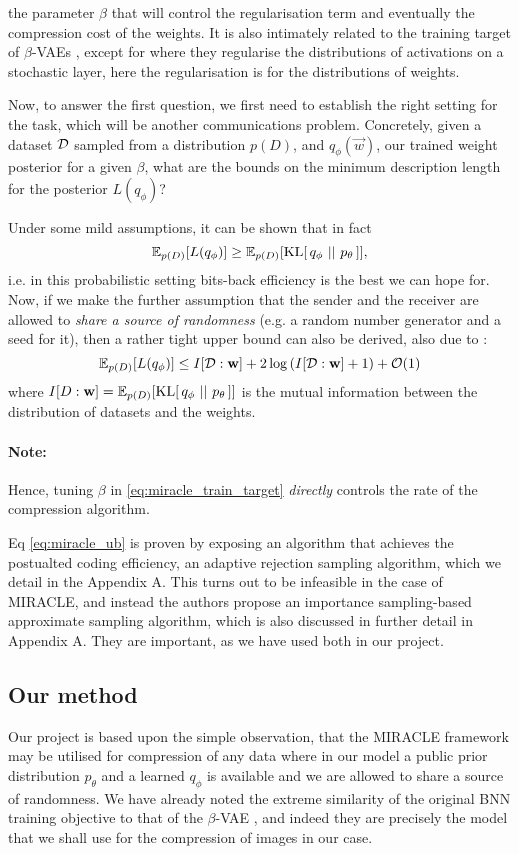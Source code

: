 the parameter $\beta$ that will control the regularisation term and eventually
the compression cost of the weights. It is also intimately related to the
training target of $\beta$-VAEs \cite{higgins2017beta}, except for where they
regularise the distributions of activations on a stochastic layer, here the
regularisation is for the distributions of weights. 
\par
Now, to answer the first question, we first need to establish the right setting
for the task, which will be another communications problem.
Concretely, given a dataset $\mathcal{D}$ sampled from a distribution $p(D)$, and
$q_\phi(\vec{w})$, our trained weight posterior for a given $\beta$, what are
the bounds on the minimum description length for the posterior $L(q_{\phi})$?
\par
Under some mild assumptions, it can be shown \cite{harsha2007communication} that
in fact
\[
  \mathbb{E}_{p(D)}[L(q_{\phi})] \geq \mathbb{E}_{p(D)}[\mathrm{KL}[\,q_{\phi}\,\,||\,\,p_{\theta}\,]],
\]
i.e. in this probabilistic setting bits-back efficiency is the best we can hope
for. Now, if we make the further assumption that the sender and the receiver are
allowed to \textit{share a source of randomness} (e.g. a random number generator
and a seed for it), then a rather tight upper bound can also be derived, also
due to \cite{harsha2007communication}:
\begin{equation}
\label{eq:miracle_ub}
  \mathbb{E}_{p(D)}[L(q_{\phi})] \leq I[\mathcal{D} : \mathbf{w}] + 2 \log \left( I[\mathcal{D} :
    \mathbf{w}] + 1 \right) + \mathcal{O}(1)
\end{equation}
where $I[D : \mathbf{w}] = \mathbb{E}_{p(D)}[\mathrm{KL}[\,q_{\phi}\,\,||\,\,p_{\theta}\,]]$ is the
mutual information between the distribution of datasets and the weights.
\paragraph{Note:} Hence, tuning $\beta$ in \ref{eq:miracle_train_target}
\textit{directly} controls the rate of the compression algorithm.
\par
Eq \ref{eq:miracle_ub} is proven by exposing an algorithm that achieves the
postualted coding efficiency, an adaptive rejection sampling algorithm, which we
detail in the Appendix A. This turns out to be infeasible in the case of
MIRACLE, and instead the authors propose an importance sampling-based
approximate sampling algorithm, which is also discussed in further detail in
Appendix A. They are important, as we have used both in our project.

\subsection{Our method}
Our project is based upon the simple observation, that
the MIRACLE framework may be utilised for compression of any data where in our
model a public prior distribution $p_{\theta}$ and a learned $q_{\phi}$ is
available and we are allowed to share a source of randomness. We have already
noted the extreme similarity of the original BNN training objective to that of
the $\beta$-VAE \cite{higgins2017beta}, and indeed they are precisely the model
that we shall use for the compression of images in our case. 


